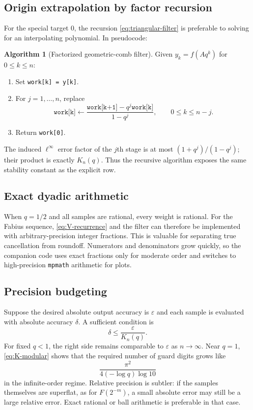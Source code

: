 \documentclass[11pt,oneside]{article}
\numberwithin{equation}{section}
\theoremstyle{definition}
\newtheorem{algorithm}[algorithm]{Algorithm}
\theoremstyle{remark}
\begin{document}
\subsection{Origin extrapolation by factor recursion}

For the special target $0$, the recursion \eqref{eq:triangular-filter} is
preferable to solving for an interpolating polynomial.  In pseudocode:

\begin{algorithm}[Factorized geometric-comb filter]
Given $y_k=f(Aq^k)$ for $0\le k\le n$:
\begin{enumerate}[leftmargin=2em]
\item Set \texttt{work[k] = y[k]}.
\item For $j=1,\ldots,n$, replace
\[
 \texttt{work[k]}
 \leftarrow
 \frac{\texttt{work[k+1]}-q^j\texttt{work[k]}}{1-q^j},
 \qquad 0\le k\le n-j.
\]
\item Return \texttt{work[0]}.
\end{enumerate}
\end{algorithm}

The induced $\ell^\infty$ error factor of the $j$th stage is at most
$(1+q^j)/(1-q^j)$; their product is exactly $K_n(q)$.  Thus the recursive
algorithm exposes the same stability constant as the explicit row.

\subsection{Exact dyadic arithmetic}

When $q=1/2$ and all samples are rational, every weight is rational.  For the
Fabius sequence, \eqref{eq:V-recurrence} and the filter can therefore be
implemented with arbitrary-precision integer fractions.  This is valuable for
separating true cancellation from roundoff.  Numerators and denominators grow
quickly, so the companion code uses exact fractions only for moderate order and
switches to high-precision \texttt{mpmath} arithmetic for plots.

\subsection{Precision budgeting}

Suppose the desired absolute output accuracy is $\varepsilon$ and each sample
is evaluated with absolute accuracy $\delta$.  A sufficient condition is
\begin{equation}
 \delta\le\frac{\varepsilon}{K_n(q)}.
 \label{eq:precision-budget}
\end{equation}
For fixed $q<1$, the right side remains comparable to $\varepsilon$ as
$n\to\infty$.  Near $q=1$, \eqref{eq:K-modular} shows that the required number
of guard digits grows like
\[
 \frac{\pi^2}{4(-\log q)\log 10}
\]
in the infinite-order regime.  Relative precision is subtler: if the samples
themselves are superflat, as for $F(2^{-m})$, a small absolute error may still
be a large relative error.  Exact rational or ball arithmetic is preferable in
that case.
\end{document}
